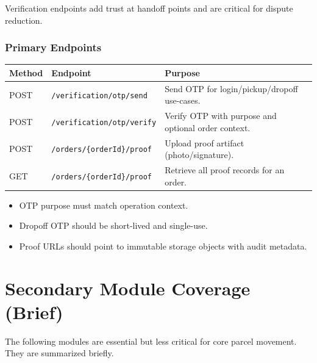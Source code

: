 Verification endpoints add trust at handoff points and are critical for
dispute reduction.

\subsubsection{Primary Endpoints}

\begin{tabularx}{\textwidth}{@{}p{2.2cm}p{4.8cm}X@{}}
\toprule
\textbf{Method} & \textbf{Endpoint} & \textbf{Purpose} \\
\midrule
POST & \texttt{/verification/otp/send} & Send OTP for login/pickup/dropoff use-cases. \\
POST & \texttt{/verification/otp/verify} & Verify OTP with purpose and optional order context. \\
POST & \texttt{/orders/\{orderId\}/proof} & Upload proof artifact (photo/signature). \\
GET & \texttt{/orders/\{orderId\}/proof} & Retrieve all proof records for an order. \\
\bottomrule
\end{tabularx}

\begin{tcolorbox}[
		enhanced,
		colback=WarnOrange!8,
		colframe=WarnOrange,
		arc=4pt,
		boxrule=0.8pt,
		left=10pt, right=10pt, top=6pt, bottom=6pt,
		title={\bfseries Verification Policy Notes},
		fonttitle=\bfseries\color{white},
		colbacktitle=WarnOrange
]
\begin{itemize}
		\item OTP purpose must match operation context.
		\item Dropoff OTP should be short-lived and single-use.
		\item Proof URLs should point to immutable storage objects with audit metadata.
\end{itemize}
\end{tcolorbox}

\section{Secondary Module Coverage (Brief)}

The following modules are essential but less critical for core parcel movement.
They are summarized briefly.

